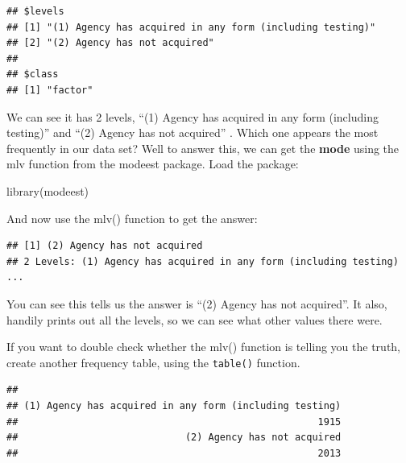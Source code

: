 \documentclass[
]{book}
\newenvironment{Shaded}{\begin{snugshade}}{\end{snugshade}}
\newcommand{\FunctionTok}[1]{\textcolor[rgb]{0.00,0.00,0.00}{#1}}
\newcommand{\NormalTok}[1]{#1}
\newcommand{\SpecialCharTok}[1]{\textcolor[rgb]{0.00,0.00,0.00}{#1}}
\begin{document}
\begin{verbatim}
## $levels
## [1] "(1) Agency has acquired in any form (including testing)"
## [2] "(2) Agency has not acquired"                            
## 
## $class
## [1] "factor"
\end{verbatim}

We can see it has 2 levels, ``(1) Agency has acquired in any form (including testing)'' and ``(2) Agency has not acquired'' . Which one appears the most frequently in our data set? Well to answer this, we can get the \textbf{mode} using the mlv function from the modeest package. Load the package:

\begin{Shaded}
\begin{Highlighting}[]
\FunctionTok{library}\NormalTok{(modeest)}
\end{Highlighting}
\end{Shaded}

And now use the mlv() function to get the answer:

\begin{Shaded}
\end{Shaded}

\begin{verbatim}
## [1] (2) Agency has not acquired
## 2 Levels: (1) Agency has acquired in any form (including testing) ...
\end{verbatim}

You can see this tells us the answer is ``(2) Agency has not acquired''. It also, handily prints out all the levels, so we can see what other values there were.

If you want to double check whether the mlv() function is telling you the truth, create another frequency table, using the \texttt{table()} function.

\begin{Shaded}
\end{Shaded}

\begin{verbatim}
## 
## (1) Agency has acquired in any form (including testing) 
##                                                    1915 
##                             (2) Agency has not acquired 
##                                                    2013
\end{verbatim}
\end{document}

